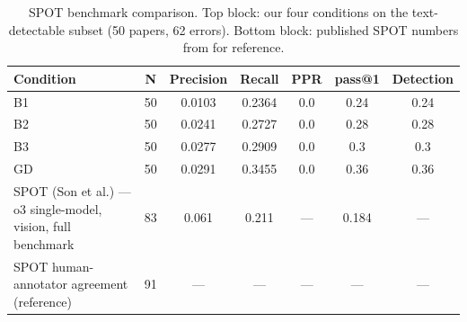 \begin{table}[ht]
\centering
\caption{SPOT benchmark comparison. Top block: our four conditions on the text-detectable subset (50 papers, 62 errors). Bottom block: published SPOT numbers from \citet{son2025spot} for reference.}
\label{tab:spot_comparison}
\small
\begin{tabular}{lcccccc}
\toprule
\textbf{Condition} & \textbf{N} & \textbf{Precision} & \textbf{Recall} & \textbf{PPR} & \textbf{pass@1} & \textbf{Detection} \\
\midrule
B1 & 50 & 0.0103 & 0.2364 & 0.0 & 0.24 & 0.24 \\
B2 & 50 & 0.0241 & 0.2727 & 0.0 & 0.28 & 0.28 \\
B3 & 50 & 0.0277 & 0.2909 & 0.0 & 0.3 & 0.3 \\
GD & 50 & 0.0291 & 0.3455 & 0.0 & 0.36 & 0.36 \\
\midrule
SPOT (Son et al.) — o3 single-model, vision, full benchmark & 83 & 0.061 & 0.211 & — & 0.184 & — \\
SPOT human-annotator agreement (reference) & 91 & — & — & — & — & — \\
\bottomrule
\end{tabular}
\end{table}
